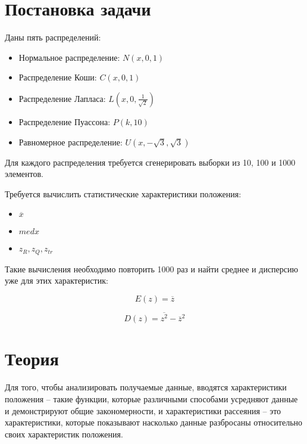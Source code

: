 \section{Постановка задачи}
Даны пять распределений:
\begin{itemize}
\item Нормальное распределение: $N(x, 0, 1)$
\item Распределение Коши: $C(x, 0, 1)$
\item Распределение Лапласа: $L(x, 0, \frac{1}{\sqrt{2}})$
\item Распределение Пуассона: $P(k, 10)$
\item Равномерное распределение: $U(x, -\sqrt{3}, \sqrt{3})$
\end{itemize}

Для каждого распределения требуется сгенерировать выборки из 10, 100 и 1000 элементов. 

Требуется вычислить статистические характеристики положения:
\begin{itemize}
	\item $\overline{x}$
	\item $med x$
	\item $z_R, z_Q, z_{tr}$
\end{itemize}

Такие вычисления необходимо повторить 1000 раз и найти среднее и дисперсию уже для этих характеристик:

\begin{equation}\label{ez}
	E(z)=\overline{z}
\end{equation}

\begin{equation}\label{dz}
	D(z)=\overline{z^2}-\overline{z}^2
\end{equation}

\section{Теория}

Для того, чтобы анализировать получаемые данные, вводятся характеристики положения -- такие функции, которые различными способами усредняют данные и демонстрируют общие закономерности, и характеристики рассеяния -- это характеристики, которые показывают насколько данные разбросаны относительно своих характеристик положения.

